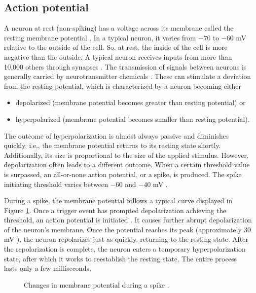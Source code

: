 \subsection{Action potential}
\label{sec:action-potential}

A neuron at rest (non-spiking) has a voltage across its membrane called the resting membrane potential \cite{KandelBook2003:6}. In a typical neuron, it varies from $-70$ to $-60$ mV relative to the outside of the cell. So, at rest, the inside of the cell is more negative than the outside. A typical neuron receives inputs from more than 10,000 others through synapses \cite{IzhikevichBook2004:2}. The transmission of signals between neurons is generally carried by neurotransmitter chemicals \cite{KandelBook2003:6}. These can stimulate a deviation from the resting potential, which is characterized by a neuron becoming either
\begin{itemize}
    \item depolarized (membrane potential becomes greater than resting potential) or
    
    \item hyperpolarized (membrane potential becomes smaller than resting potential).
\end{itemize}

The outcome of hyperpolarization is almost always passive and diminishes quickly, i.e., the membrane potential returns to its resting state shortly. Additionally, its size is proportional to the size of the applied stimulus. However, depolarization often leads to a different outcome. When a certain threshold value is surpassed, an all-or-none action potential, or a spike, is produced. The spike initiating threshold varies between $-60$ and $-40$ mV \cite{Platkiewicz2010}. 

During a spike, the membrane potential follows a typical curve displayed in Figure \ref{fig:action-potential}. Once a trigger event has prompted depolarization achieving the threshold, an action potential is initiated \cite{KandelBook2003:7}. It causes further abrupt depolarization of the neuron's membrane. Once the potential reaches its peak (approximately $30$ mV \cite{Izhikevich2003}), the neuron repolarizes just as quickly, returning to the resting state. After the repolarization is complete, the neuron enters a temporary hyperpolarization state, after which it works to reestablish the resting state. The entire process lasts only a few milliseconds.

\begin{figure}
    \centering
    
    \caption[Changes in membrane potential during a spike]{Changes in membrane potential during a spike \cite{ClarkBook2018:35.2}.}
    \label{fig:action-potential}
\end{figure}
